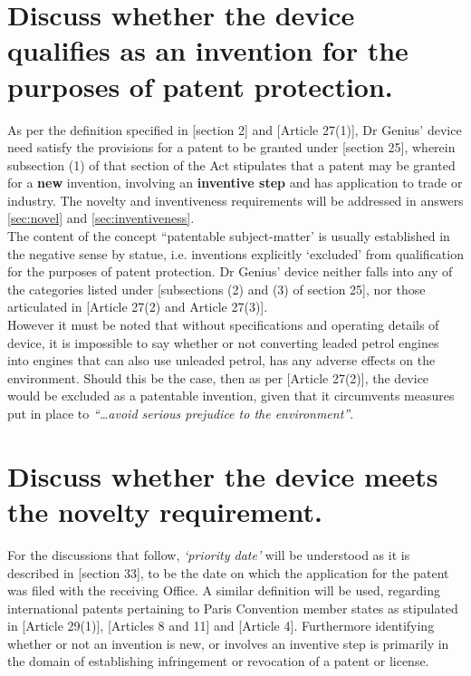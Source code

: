 \documentclass[11pt]{article}
\begin{document}
\section{Discuss whether the device qualifies as an invention for the purposes of patent protection.}
\label{sec:org0418362}
\label{sec:invention}

As per the definition specified in [section 2]\cite{rsa78_patents_act} and [Article 27(1)]\cite{wto17_trips}, Dr Genius' device need satisfy the provisions for a patent to be granted under [section 25]\cite{rsa78_patents_act}, wherein subsection (1) of that section of the Act stipulates that a patent may be granted for a \textbf{new} invention, involving an \textbf{inventive step} and has application to trade or industry. The novelty and inventiveness requirements will be addressed in answers \ref{sec:novel} and \ref{sec:inventiveness}.\\

The content of the concept ``patentable subject-matter' is usually established in the negative sense by statue, i.e. inventions explicitly `excluded' from qualification for the purposes of patent protection. Dr Genius' device neither falls into any of the categories listed under [subsections (2) and (3) of section 25]\cite{rsa78_patents_act}, nor those articulated in [Article 27(2) and Article 27(3)]\cite{wto17_trips}.\\

However it must be noted that without specifications and operating details of device, it is impossible to say whether or not converting leaded petrol engines into engines that can also use unleaded petrol, has any adverse effects on the environment. Should this be the case, then as per [Article 27(2)]\cite{wto17_trips}, the device would be excluded as a patentable invention, given that it circumvents measures put in place to \emph{``\ldots{}avoid serious prejudice to the environment''}.

\section{Discuss whether the device meets the novelty requirement.}
\label{sec:org805aa85}
\label{sec:novel}

For the discussions that follow, \emph{`priority date'} will be understood as it is
described in [section 33]\cite{rsa78_patents_act}, to be the date on which the
application for the patent was filed with the receiving Office. A similar
definition will be used, regarding international patents pertaining to Paris
Convention member states as stipulated in [Article 29(1)]\cite{wto17_trips},
[Articles 8 and 11]\cite{wipo70_pct} and [Article 4]\cite{wipo83_paris_conve_protect_ip}. Furthermore identifying whether or not an invention is new, or involves an inventive step is primarily in the domain of establishing infringement or revocation of a patent or license.\\
\end{document}
